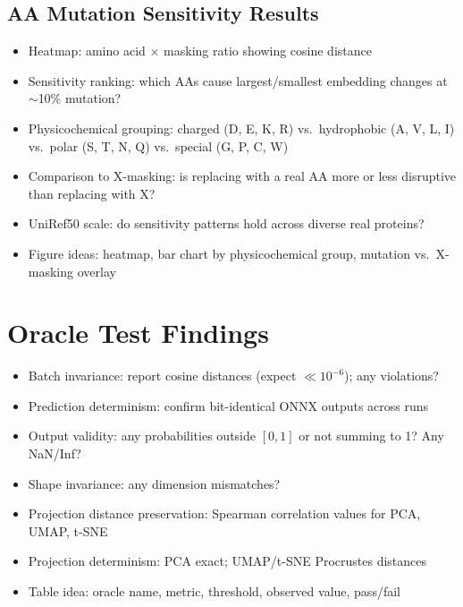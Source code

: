 \subsection{AA Mutation Sensitivity Results}\label{sec:eval-mutation-sensitivity}
\begin{itemize}
  \item Heatmap: amino acid $\times$ masking ratio showing cosine distance
  \item Sensitivity ranking: which AAs cause largest/smallest embedding changes at $\sim$10\% mutation?
  \item Physicochemical grouping: charged (D, E, K, R) vs.\ hydrophobic (A, V, L, I) vs.\ polar (S, T, N, Q) vs.\ special (G, P, C, W)
  \item Comparison to X-masking: is replacing with a real AA more or less disruptive than replacing with X?
  \item UniRef50 scale: do sensitivity patterns hold across diverse real proteins?
  \item Figure ideas: heatmap, bar chart by physicochemical group, mutation vs.\ X-masking overlay
\end{itemize}

\section{Oracle Test Findings}\label{sec:eval-oracles}
\begin{itemize}
  \item Batch invariance: report cosine distances (expect $\ll 10^{-6}$); any violations?
  \item Prediction determinism: confirm bit-identical ONNX outputs across runs
  \item Output validity: any probabilities outside $[0,1]$ or not summing to 1? Any NaN/Inf?
  \item Shape invariance: any dimension mismatches?
  \item Projection distance preservation: Spearman correlation values for PCA, UMAP, t-SNE
  \item Projection determinism: PCA exact; UMAP/t-SNE Procrustes distances
  \item Table idea: oracle name, metric, threshold, observed value, pass/fail
\end{itemize}

